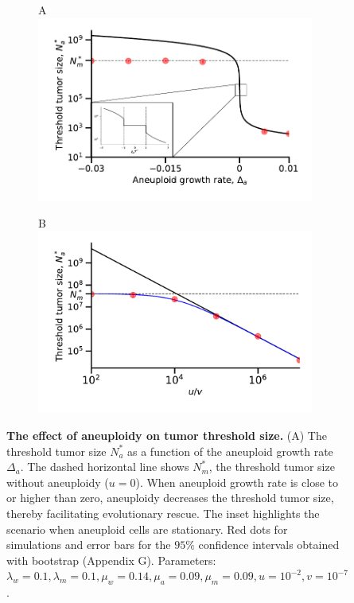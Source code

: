 \documentclass[12pt]{extarticle}
\begin{document}
\begin{figure}
\begin{subfigure}{0.5\textwidth}
A\\
\includegraphics[width=1\textwidth]{Figures/ThresholdPopulationSizePlot.pdf}
\end{subfigure}
\begin{subfigure}{0.5\textwidth}
B\\
\includegraphics[width=1\textwidth]{Figures/ThresholdPopulationSizeVersusRatioPlot.pdf}
\end{subfigure}
\caption{
\textbf{The effect of aneuploidy on tumor threshold size.}
(A) The threshold tumor size $N_a^*$ as a function of the aneuploid growth rate $\Delta_a$. The dashed horizontal line shows $N^*_m$, the threshold tumor size without aneuploidy ($u=0$).  When aneuploid growth rate is close to or higher than zero, aneuploidy decreases the threshold tumor size, thereby facilitating evolutionary rescue. The inset highlights the scenario when aneuploid cells are stationary. Red dots for simulations and error bars for the $95\%$ confidence intervals obtained with bootstrap (Appendix G). Parameters: $\lambda_w=0.1,\lambda_m=0.1,\mu_w=0.14,\mu_a=0.09,\mu_m=0.09, u=10^{-2}, v=10^{-7}$.
}
\end{figure}
\end{document}
